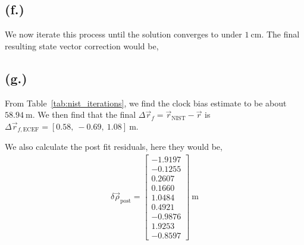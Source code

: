 \documentclass[11pt]{article}
\begin{document}
\subsection*{(f.)}
\hspace*{2em}We now iterate this process until the solution converges to under $1~\mathrm{cm}$. The final resulting state vector correction would be,
\begin{table}[h]
\centering
{}
\caption{State vector corrections and updated position}
\label{tab:nist_iterations}
\end{table}

\subsection*{(g.)}
\hspace*{2em}From Table~\ref{tab:nist_iterations}, we find the clock bias estimate to be about $\boxed{58.94~\mathrm{m}}$. We then find that the final $\Delta\vec{r}_f = \vec{r}_{\mathrm{NIST}} - \vec{r}$ is $\boxed{\Delta\vec{r}_{f,\mathrm{ECEF}} = [0.58,\ -0.69,\ 1.08]~\mathrm{m}}$.

\hspace*{2em}We also calculate the post fit residuals, here they would be,
\begin{gather*}
\delta\vec{\rho}_{\mathrm{post}} = \begin{bmatrix} -1.9197 \\ -0.1255 \\ 0.2607 \\ 0.1660 \\ 1.0484 \\ 0.4921 \\ -0.9876 \\ 1.9253 \\ -0.8597 \end{bmatrix}~\mathrm{m}
\end{gather*}
\end{document}

